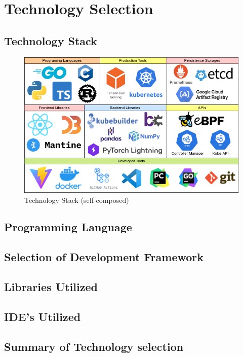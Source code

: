 \section{Technology Selection}
\subsection{Technology Stack}
\begin{figure}[H]
    \includegraphics[width=16cm]{assets/implementation/technology-stack.png}
    \caption{Technology Stack (self-composed)}
    \label{fig:technology-stack}
\end{figure}

\subsection{Programming Language}
\subsection{Selection of Development Framework}
\subsection{Libraries Utilized}
\subsection{IDE’s Utilized}
\subsection{Summary of Technology selection}